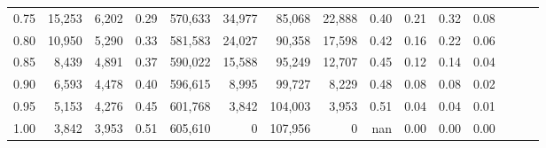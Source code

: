 \begin{tabular}{rrrrrrrrrrrrrrr}
0.75 &  15,253 &  6,202 &  0.29 &  570,633 &   34,977 &   85,068 &   22,888 &  0.40 &  0.21 &  0.32 &      0.08 \\
0.80 &  10,950 &  5,290 &  0.33 &  581,583 &   24,027 &   90,358 &   17,598 &  0.42 &  0.16 &  0.22 &      0.06 \\
0.85 &   8,439 &  4,891 &  0.37 &  590,022 &   15,588 &   95,249 &   12,707 &  0.45 &  0.12 &  0.14 &      0.04 \\
0.90 &   6,593 &  4,478 &  0.40 &  596,615 &    8,995 &   99,727 &    8,229 &  0.48 &  0.08 &  0.08 &      0.02 \\
0.95 &   5,153 &  4,276 &  0.45 &  601,768 &    3,842 &  104,003 &    3,953 &  0.51 &  0.04 &  0.04 &      0.01 \\
1.00 &   3,842 &  3,953 &  0.51 &  605,610 &        0 &  107,956 &        0 &   nan &  0.00 &  0.00 &      0.00 \\
\bottomrule
\end{tabular}
